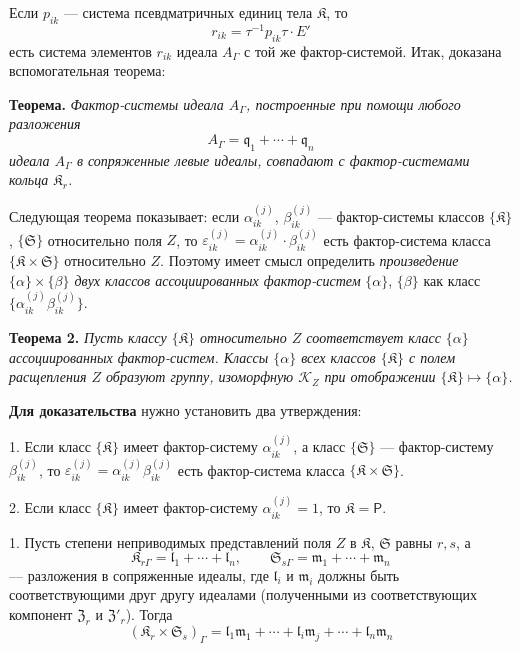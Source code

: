 \documentclass[11pt]{article}
\begin{document}
Если \(p_{ik}\) --- система псевдматричных единиц тела \(\mathfrak K\), то
\[
r_{ik}=\tau^{-1}p_{ik}\tau\cdot E'
\]
есть система элементов \(r_{ik}\) идеала \(A_\Gamma\) с той же фактор-системой. Итак, доказана вспомогательная теорема:

\textbf{Теорема.} \emph{Фактор-системы идеала \(A_\Gamma\), построенные при помощи любого разложения}
\[
A_\Gamma=\mathfrak q_1+\cdots+\mathfrak q_n
\]
\emph{идеала \(A_\Gamma\) в сопряженные левые идеалы, совпадают с фактор-системами кольца \(\mathfrak K_r\).}

Следующая теорема показывает: если \(\alpha_{ik}^{(j)}\), \(\beta_{ik}^{(j)}\) --- фактор-системы классов \(\{\mathfrak K\}\), \(\{\mathfrak S\}\) относительно поля \(Z\), то \(\varepsilon_{ik}^{(j)}=\alpha_{ik}^{(j)}\cdot\beta_{ik}^{(j)}\) есть фактор-система класса \(\{\mathfrak K\times\mathfrak S\}\) относительно \(Z\). Поэтому имеет смысл определить \emph{произведение \(\{\alpha\}\times\{\beta\}\) двух классов ассоциированных фактор-систем} \(\{\alpha\}\), \(\{\beta\}\) как класс \(\{\alpha_{ik}^{(j)}\beta_{ik}^{(j)}\}\).

\textbf{Теорема 2.} \emph{Пусть классу \(\{\mathfrak K\}\) относительно \(Z\) соответствует класс \(\{\alpha\}\) ассоциированных фактор-систем. Классы \(\{\alpha\}\) всех классов \(\{\mathfrak K\}\) с полем расщепления \(Z\) образуют группу, изоморфную \(\mathscr K_Z\) при отображении \(\{\mathfrak K\}\mapsto\{\alpha\}\).}

\textbf{Для доказательства} нужно установить два утверждения:

1. Если класс \(\{\mathfrak K\}\) имеет фактор-систему \(\alpha_{ik}^{(j)}\), а класс \(\{\mathfrak S\}\) --- фактор-систему \(\beta_{ik}^{(j)}\), то \(\varepsilon_{ik}^{(j)}=\alpha_{ik}^{(j)}\beta_{ik}^{(j)}\) есть фактор-система класса \(\{\mathfrak K\times\mathfrak S\}\).

2. Если класс \(\{\mathfrak K\}\) имеет фактор-систему \(\alpha_{ik}^{(j)}=1\), то \(\mathfrak K=\mathsf P\).

1. Пусть степени неприводимых представлений поля \(Z\) в \(\mathfrak K\), \(\mathfrak S\) равны \(r,s\), а
\[
\mathfrak K_{r\Gamma}=\mathfrak l_1+\cdots+\mathfrak l_n,\qquad
\mathfrak S_{s\Gamma}=\mathfrak m_1+\cdots+\mathfrak m_n
\]
--- разложения в сопряженные идеалы, где \(\mathfrak l_i\) и \(\mathfrak m_i\) должны быть соответствующими друг другу идеалами (полученными из соответствующих компонент \(\mathfrak Z_r\) и \(\mathfrak Z'_r\)). Тогда
\[
(\mathfrak K_r\times\mathfrak S_s)_\Gamma
=\mathfrak l_1\mathfrak m_1+\cdots+\mathfrak l_i\mathfrak m_j+\cdots+\mathfrak l_n\mathfrak m_n
\]
\end{document}
